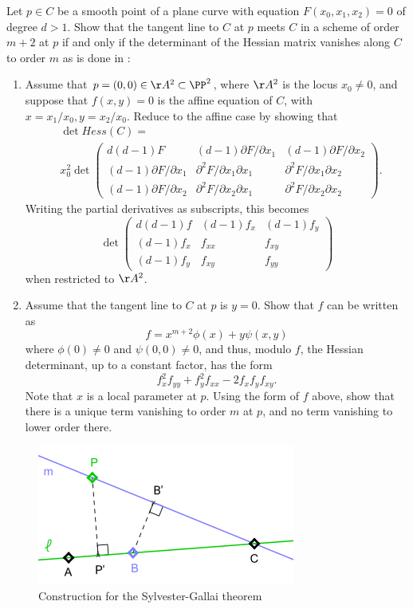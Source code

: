 \begin{exercise}\label{Hessian exercise} 
Let $p\in C$ be a smooth point of a  plane curve with equation $F(x_0,x_1,x_2) = 0$ of degree $d>1$. Show that the tangent line to $C$ at $p$ meets
$C$ in a scheme of order $m+2$ at $p$ if and only if the determinant of the Hessian matrix vanishes
along $C$ to order $m$ as is done in \cite[pp. 84--85]{Kunz}:

\begin{enumerate}
\item Assume that $p = (0,0)\in \AA^2\subset \PP^2$, where $\AA^2$ is the locus $x_0\neq 0$, 
and suppose that $f(x,y) =0$ is the affine equation of $C$, with $x= x_1/x_0, y = x_2/x_0$.
Reduce to the affine case by showing that
$$
\begin{aligned}
&\det Hess(C) = \\
&x_0^2 \det 
\begin{pmatrix}
 d(d-1)F & (d-1) \partial F/\partial x_1 & (d-1) \partial F/\partial x_2 \\
 (d-1) \partial F/\partial x_1&\partial^2 F/\partial x_1 \partial x_1 & \partial^2 F/\partial x_1 \partial x_2\\
 (d-1) \partial F/\partial x_2 &\partial^2 F/\partial x_2 \partial x_1 & \partial^2 F/\partial x_2 \partial x_2 
\end{pmatrix} .
\end{aligned}
$$ 
Writing the partial derivatives as subscripts, this becomes
$$
\det \begin{pmatrix}
 d(d-1)f & (d-1) f_x & (d-1) f_y \\
 (d-1) f_x&f_{xx} & f_{xy}\\
 (d-1) f_y &f_{xy} & f_{yy}
\end{pmatrix}
$$ 
when restricted to $\AA^2$.

\item Assume that the tangent line to $C$ at $p$ is $y=0$. Show that $f$ can be written as
$$
f = x^{m+2}\phi(x) +y\psi(x,y)
$$
where $\phi(0) \neq 0$ and $\psi(0,0) \neq 0$, and thus, modulo $f$, the Hessian determinant,
up to a constant factor, 
has the form
$$
f_x^2f_{yy}+f_y^2f_{xx}-2f_xf_yf_{xy}.
$$
Note that $x$ is a local parameter at $p$. Using the form of $f$ above, show that there is a unique term vanishing to order $m$ at $p$,
and no term vanishing to lower order there.
\end{enumerate}
\end{exercise}

\begin{figure}
\centerline {\includegraphics[height=.75in]{"Sylvester_Gallai_Kelly_proof"}}
\caption{Construction for the Sylvester-Gallai theorem}
\label{Fig4-S}
\end{figure}

